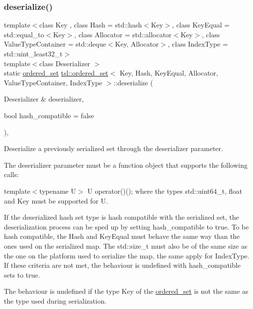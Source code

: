 \subsubsection{\texorpdfstring{deserialize()}{deserialize()}}
{\footnotesize\ttfamily template$<$class Key , class Hash  = std\+::hash$<$\+Key$>$, class Key\+Equal  = std\+::equal\+\_\+to$<$\+Key$>$, class Allocator  = std\+::allocator$<$\+Key$>$, class Value\+Type\+Container  = std\+::deque$<$\+Key, Allocator$>$, class Index\+Type  = std\+::uint\+\_\+least32\+\_\+t$>$ \\
template$<$class Deserializer $>$ \\
static \mbox{\hyperlink{classtsl_1_1ordered__set}{ordered\+\_\+set}} \mbox{\hyperlink{classtsl_1_1ordered__set}{tsl\+::ordered\+\_\+set}}$<$ Key, Hash, Key\+Equal, Allocator, Value\+Type\+Container, Index\+Type $>$\+::deserialize (\begin{DoxyParamCaption}\item[{Deserializer \&}]{deserializer,  }\item[{bool}]{hash\+\_\+compatible = {\ttfamily false} }\end{DoxyParamCaption})\hspace{0.3cm}{\ttfamily [inline]}, {\ttfamily [static]}}

Deserialize a previously serialized set through the {\ttfamily deserializer} parameter.

The {\ttfamily deserializer} parameter must be a function object that supports the following calls\+:
\begin{DoxyItemize}
\item {\ttfamily template$<$typename U$>$ U operator()();} where the types {\ttfamily std\+::uint64\+\_\+t}, {\ttfamily float} and {\ttfamily Key} must be supported for U.
\end{DoxyItemize}

If the deserialized hash set type is hash compatible with the serialized set, the deserialization process can be sped up by setting {\ttfamily hash\+\_\+compatible} to true. To be hash compatible, the Hash and Key\+Equal must behave the same way than the ones used on the serialized map. The {\ttfamily std\+::size\+\_\+t} must also be of the same size as the one on the platform used to serialize the map, the same apply for {\ttfamily Index\+Type}. If these criteria are not met, the behaviour is undefined with {\ttfamily hash\+\_\+compatible} sets to true.

The behaviour is undefined if the type {\ttfamily Key} of the {\ttfamily \mbox{\hyperlink{classtsl_1_1ordered__set}{ordered\+\_\+set}}} is not the same as the type used during serialization.

